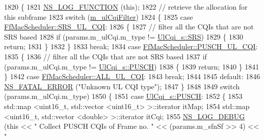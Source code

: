 \begin{DoxyCode}
1820 \{
1821   \hyperlink{log-macros-disabled_8h_a90b90d5bad1f39cb1b64923ea94c0761}{NS\_LOG\_FUNCTION} (\textcolor{keyword}{this});
1822 \textcolor{comment}{// retrieve the allocation for this subframe}
1823   \textcolor{keywordflow}{switch} (\hyperlink{classns3_1_1FfMacScheduler_adae16e66a1c4231da80a1221297442cf}{m\_ulCqiFilter})
1824     \{
1825     \textcolor{keywordflow}{case} \hyperlink{classns3_1_1FfMacScheduler_aa47a9eb25f2c558c825b0be645304a52af2e0df473ba2c8f9cb131cb760591aed}{FfMacScheduler::SRS\_UL\_CQI}:
1826       \{
1827         \textcolor{comment}{// filter all the CQIs that are not SRS based}
1828         \textcolor{keywordflow}{if} (params.m\_ulCqi.m\_type != \hyperlink{structns3_1_1UlCqi__s_aece9e5ebea42eb9ff1744c72c8459b57af4b6dba4243636562c910c4d4761dd7e}{UlCqi\_s::SRS})
1829           \{
1830             \textcolor{keywordflow}{return};
1831           \}
1832       \}
1833       \textcolor{keywordflow}{break};
1834     \textcolor{keywordflow}{case} \hyperlink{classns3_1_1FfMacScheduler_aa47a9eb25f2c558c825b0be645304a52a4a833bc779439b15bd904e1dd8eaa563}{FfMacScheduler::PUSCH\_UL\_CQI}:
1835       \{
1836         \textcolor{comment}{// filter all the CQIs that are not SRS based}
1837         \textcolor{keywordflow}{if} (params.m\_ulCqi.m\_type != \hyperlink{structns3_1_1UlCqi__s_aece9e5ebea42eb9ff1744c72c8459b57a9716b20a3095c473ae3fde1eb5d0bb63}{UlCqi\_s::PUSCH})
1838           \{
1839             \textcolor{keywordflow}{return};
1840           \}
1841       \}
1842     \textcolor{keywordflow}{case} \hyperlink{classns3_1_1FfMacScheduler_aa47a9eb25f2c558c825b0be645304a52a84059a597c72335f0a5963c3efcbda71}{FfMacScheduler::ALL\_UL\_CQI}:
1843       \textcolor{keywordflow}{break};
1844 
1845     \textcolor{keywordflow}{default}:
1846       \hyperlink{group__fatal_ga5131d5e3f75d7d4cbfd706ac456fdc85}{NS\_FATAL\_ERROR} (\textcolor{stringliteral}{"Unknown UL CQI type"});
1847     \}
1848 
1849   \textcolor{keywordflow}{switch} (params.m\_ulCqi.m\_type)
1850     \{
1851     \textcolor{keywordflow}{case} \hyperlink{structns3_1_1UlCqi__s_aece9e5ebea42eb9ff1744c72c8459b57a9716b20a3095c473ae3fde1eb5d0bb63}{UlCqi\_s::PUSCH}:
1852       \{
1853         std::map <uint16\_t, std::vector <uint16\_t> >::iterator itMap;
1854         std::map <uint16\_t, std::vector <double> >::iterator itCqi;
1855         \hyperlink{group__logging_ga413f1886406d49f59a6a0a89b77b4d0a}{NS\_LOG\_DEBUG} (\textcolor{keyword}{this} << \textcolor{stringliteral}{" Collect PUSCH CQIs of Frame no. "} << (params.m\_sfnSf >> 4) << \textcolor{stringliteral}{"
}
\end{DoxyCode}

